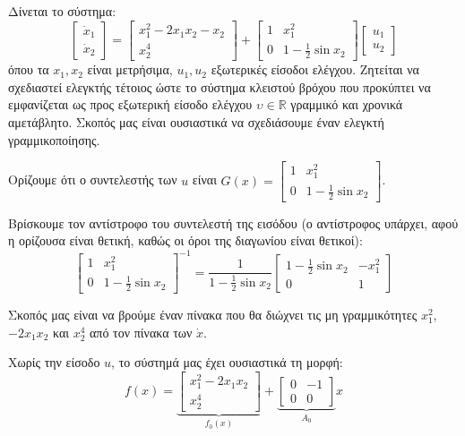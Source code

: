 \documentclass[11pt,a4paper,notitlepage,fleqn]{article}
\let\mytodo\todo
\renewcommand{\todo}[1]{\par\mytodo[inline,noline]{#1}}
\begin{document}
\begin{exercise}
	Δίνεται το σύστημα:
	\[
	\left[\begin{matrix}
	\dot x_1 \\ \dot x_2
	\end{matrix}\right] = \left[\begin{matrix}
	x_1^2 -2x_1x_2 -x_2 \\ x_2^4
	\end{matrix}\right] + \left[\begin{matrix}
	1 & x_1^2 \\ 0 & 1-\frac{1}{2}\sin x_2
	\end{matrix}\right]\left[\begin{matrix}
	u_1 \\ u_2
	\end{matrix}\right]
	\]
	όπου τα \( x_1,x_2 \) είναι μετρήσιμα, \( u_1,u_2 \) εξωτερικές
	είσοδοι ελέγχου. Ζητείται να σχεδιαστεί ελεγκτής τέτοιος ώστε το
	σύστημα κλειστού βρόχου που προκύπτει να εμφανίζεται ως προς εξωτερική
	είσοδο ελέγχου \( \upsilon \in \mathbb R \) γραμμικό και χρονικά
	αμετάβλητο.
	\tcblower
	Σκοπός μας είναι ουσιαστικά να σχεδιάσουμε έναν ελεγκτή γραμμικοποίησης.
	
	\todo{Graph 31}
	
	Ορίζουμε ότι ο συντελεστής των \( u \) είναι
	\( G(x) = 	\left[\begin{matrix}
	1 & x_1^2 \\ 0 & 1-\frac{1}{2}\sin x_2
	\end{matrix}\right] \).
	
	Βρίσκουμε τον αντίστροφο του συντελεστή της εισόδου (ο αντίστροφος
	υπάρχει, αφού η ορίζουσα είναι θετική, καθώς οι όροι της διαγωνίου
	είναι θετικοί):
	\[
	\left[\begin{matrix}
	1 & x_1^2 \\ 0 & 1-\frac{1}{2}\sin x_2
	\end{matrix}\right]^{-1} =
	\frac{1}{1-\frac{1}{2}\sin x_2}\left[\begin{matrix}
	1-\frac{1}{2}\sin x_2 & -x_1^2 \\ 0 & 1
	\end{matrix}\right]
	\]
	
	Σκοπός μας είναι να βρούμε έναν πίνακα που θα διώχνει τις
	μη γραμμικότητες \( x_1^2 \), \( -2x_1x_2 \) και \( x_2^4 \) από
	τον πίνακα των \( \dot x \).
	
	Χωρίς την είσοδο \( u \), το σύστημά μας έχει ουσιαστικά τη μορφή:
	\[
	f(x) = \underbrace{\left[
	\begin{matrix}
	x_1^2 - 2x_1x_2 \\ x_2^4
	\end{matrix}
	\right]}_{f_0(x)}
    + \underbrace{\left[\begin{matrix}
    0 & -1 \\ 0 & 0
    \end{matrix}\right]}_{A_0}x
	\]
	

\end{exercise}
\end{document}
